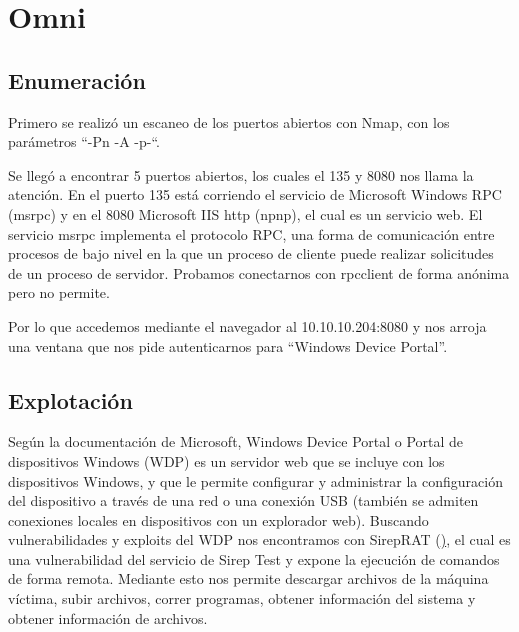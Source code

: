 \documentclass{article}
\begin{document}
\section{Omni}
\subsection{Enumeración}
Primero se realizó un escaneo de los puertos abiertos con Nmap, con los parámetros “-Pn -A -p-“.
\begin{figure}[H]
	\center
	\caption{}
\end{figure}

Se llegó a encontrar 5 puertos abiertos, los cuales el 135 y 8080 nos llama la atención. En el puerto 135 está corriendo el servicio de Microsoft Windows RPC (msrpc) y en el 8080 Microsoft IIS http (npnp), el cual es un servicio web. El servicio msrpc implementa el protocolo RPC, una forma de comunicación entre procesos de bajo nivel en la que un proceso de cliente puede realizar solicitudes de un proceso de servidor.  Probamos conectarnos con rpcclient de forma anónima pero no permite.
\begin{figure}[H]
	\center
	\caption{}
\end{figure}

Por lo que accedemos mediante el navegador al 10.10.10.204:8080 y nos arroja una ventana que nos pide autenticarnos para “Windows Device Portal”.
\begin{figure}[H]
	\center
	\caption{}
\end{figure}

\subsection{Explotación}

Según la documentación de Microsoft, Windows Device Portal o Portal de dispositivos Windows (WDP) es un servidor web que se incluye con los dispositivos Windows, y que le permite configurar y administrar la configuración del dispositivo a través de una red o una conexión USB (también se admiten conexiones locales en dispositivos con un explorador web).
Buscando vulnerabilidades y exploits del WDP nos encontramos con SirepRAT (\href{https://github.com/SafeBreach-Labs/SirepRAT}), el cual es una vulnerabilidad del servicio de Sirep Test y expone la ejecución de comandos de forma remota. Mediante esto nos permite descargar archivos de la máquina víctima, subir archivos, correr programas, obtener información del sistema y obtener información de archivos.
\begin{figure}[H]
	\center
	\caption{}
\end{figure}
\end{document}
